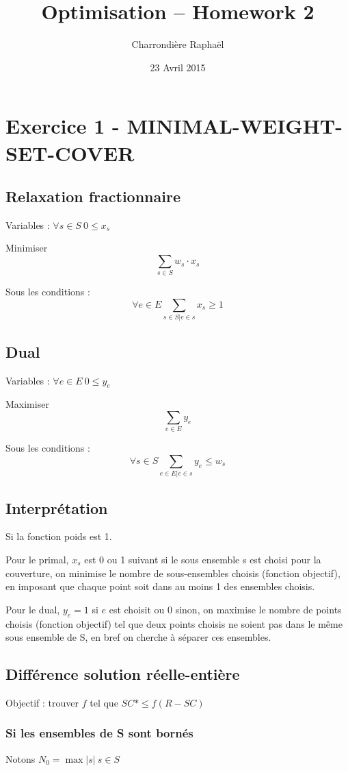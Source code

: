 \documentclass{article}
\title{Optimisation -- Homework 2}
\author{Charrondière Raphaël}
\date{23 Avril 2015}
\begin{document}
\maketitle
\section*{Exercice 1 - MINIMAL-WEIGHT-SET-COVER}
\subsection*{Relaxation fractionnaire}
Variables : $\forall s\in S\ 0 \leq x_s$

Minimiser $$\sum_{s \in S} w_s \cdot x_s$$

Sous les conditions : $$\forall e \in E \sum_{s \in S | e \in s} x_s \geq 1$$

\subsection*{Dual}
Variables : $\forall e\in E\ 0 \leq y_e$

Maximiser $$\sum_{e \in E} y_e$$

Sous les conditions : $$\forall s \in S \sum_{e \in E | e \in s} y_e \leq w_s$$

\subsection*{Interprétation}

Si la fonction poids est 1.

Pour le primal, $x_s$ est 0 ou 1 suivant si le sous ensemble s est choisi pour la couverture, on minimise  le nombre de sous-ensembles choisis (fonction objectif), en imposant que chaque point soit dans au moins 1 des ensembles choisis.

Pour le dual, $y_e=1$ si $e$ est choisit ou $0$ sinon, on maximise le nombre de points choisis (fonction objectif) tel que deux points choisis ne soient pas dans le même sous ensemble de S, en bref on cherche à séparer ces ensembles.

\subsection*{Différence solution réelle-entière}

Objectif : trouver $f$ tel que $SC*\leq f(R-SC)$

\subsubsection*{Si les ensembles de S sont bornés}
 Notons $N_0=\max{|s|\ s\in S}$
\end{document}
